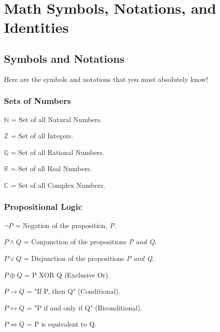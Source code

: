 \chapter{Math Symbols, Notations, and Identities}

\section{Symbols and Notations}
Here are the symbols and notations that you must absolutely know!

\subsection{Sets of Numbers}
\begin{symbollist}
    \item[$\mathbb{N}$] = Set of all Natural Numbers.
    \item[$\mathbb{Z}$] = Set of all Integers.
    \item[$\mathbb{Q}$] = Set of all Rational Numbers.
    \item[$\mathbb{R}$] = Set of all Real Numbers.
    \item[$\mathbb{C}$] = Set of all Complex Numbers.
\end{symbollist}

\subsection{Propositional Logic}
\begin{symbollist}
    \item[$\neg P$] = Negation of the proposition, \emph{P}.
    \item[$P \wedge Q$] = Conjunction of the propositions \emph{P and Q}.
    \item[$P \vee Q$] = Disjunction of the propositions \emph{P and Q}.
    \item[$P \oplus Q$] = P XOR Q (Exclusive Or).
    \item[$P \rightarrow Q$] = "If P, then Q" (Conditional).
    \item[$P \leftrightarrow Q$] = "P if and only if Q" (Biconditional).
    \item[$P \Leftrightarrow Q$] = P is equivalent to Q.
\end{symbollist}


